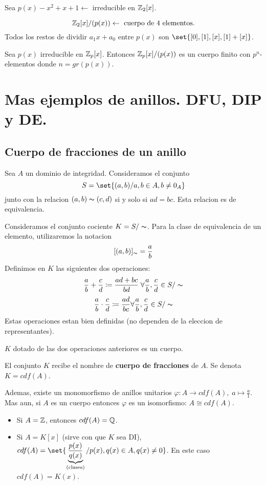 \begin{example}
	Sea \(p(x) - x^{2} + x + 1 \leftarrow \) irreducible en \(\mathbb{Z}_2[x ]\).
	
	\[
		\mathbb{Z}_2[x] / (p(x)) \leftarrow \text{ cuerpo de 4 elementos.}
	\]
	Todos los restos de dividir \(a_1 x + a_0 \) entre \(p(x )\)  son \(\set{[0],[1],[x],[1] + [x]}\).
\end{example}
\begin{theorem}
	Sea \(p(x )\) irreducible en \(\mathbb{Z}_p[x ]\). Entonces \(\mathbb{Z}_p[x ]/ (p(x))\) es un cuerpo finito con \(p^{n } \)-elementos donde \(n = gr(p(x))\).
\end{theorem}

\section{Mas ejemplos de anillos. DFU, DIP y DE.}
\subsection{Cuerpo de fracciones de un anillo}
\begin{proposition}
	Sea \(A \) un dominio de integridad. Consideramos el conjunto
	\[
		S = \set{(a,b) / a,b \in A, b \neq 0_A }
	\]
	junto con la relacion \((a,b) \thicksim (c,d )\) si y solo si \(ad = bc \). Esta relacion es de equivalencia.
\end{proposition}
\begin{proposition}
	Consideramos el conjunto cociente \(K = S/\thicksim \). Para la clase de equivalencia de un elemento, utilizaremos la notacion
	\[
		[(a,b)]_{\thicksim} = \frac{a}{b }
	\]
	Definimos en \(K \) las siguientes dos operaciones:
	\[
		\frac{a}{b} + \frac{c}{d} \coloneqq \frac{ad + bc}{bd} \; \forall \frac{a}{b}, \frac{c}{d} \in S / \thicksim
	\]
	\[
		\frac{a}{b} \cdot \frac{c}{d} \coloneqq \frac{ad}{bc } \forall \frac{a}{b}, \frac{c}{d} \in S / \thicksim
	\]
	Estas operaciones estan bien definidas (no dependen de la eleccion de representantes).
\end{proposition}
\begin{proposition}
	\(K \) dotado de las dos operaciones anteriores es un cuerpo.
	
	El conjunto \(K \) recibe el nombre de \textbf{cuerpo de fracciones}  de \(A  \). Se denota \(K = cdf(A )\).
	
	Ademas, existe un monomorfismo de anillos unitarios \(\varphi \colon A \to cdf(A ), \; a \mapsto \frac{a}{1}\). Mas aun, si \(A\) es un cuerpo entonces \(\varphi\) es un isomorfismo: \(A \cong cdf(A )\).
\end{proposition}
\begin{example}
	\begin{itemize}
		\item Si \(A = \mathbb{Z} \), entonces \(cdf(A) = \mathbb{Q} \).
		\item Si \(A = K[x ]\) (sirve con que \(K \) sea DI), \(cdf(A) = \set{\underbrace{\frac{p(x)}{q(x)}}_{\text{(clases)} } / p(x), q(x) \in A, q(x) \neq 0}\). En este caso \(cdf(A) = K(x )\).
	\end{itemize}
\end{example}
